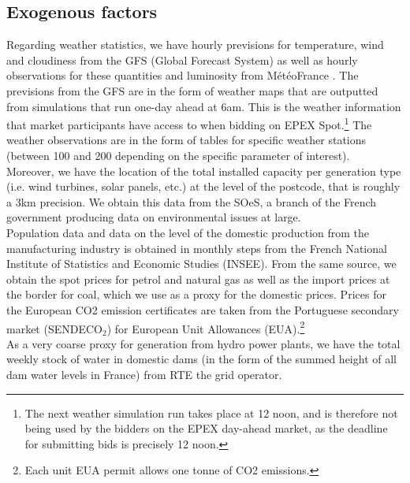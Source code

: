 \subsection*{Exogenous factors}

Regarding weather statistics, we have hourly previsions for temperature, wind and cloudiness from the GFS (Global Forecast System) as well as hourly observations for these quantities and luminosity from M\'{e}t\'{e}oFrance
. The previsions from the GFS are in the form of weather maps that are outputted from simulations that run one-day ahead at 6am. This is the weather information that market participants have access to when bidding on EPEX Spot.\footnote{The next weather simulation run takes place at 12 noon, and is therefore not being used by the bidders on the EPEX day-ahead market, as the deadline for submitting bids is precisely 12 noon.} The weather observations are in the form of tables for specific weather stations (between 100 and 200 depending on the specific parameter of interest).\\

Moreover, we have the location of the total installed capacity per generation type (i.e. wind turbines, solar panels, etc.) at the level of the postcode, that is roughly a 3km precision. We obtain this data from the SOeS, a branch of the French government producing data on environmental issues at large. \\

Population data and data on the level of the domestic production from the manufacturing industry is obtained in monthly steps from the French National Institute of Statistics and Economic Studies (INSEE). From the same source, we obtain the spot prices for petrol and natural gas as well as the import prices at the border for coal, which we use as a proxy for the domestic prices. 
Prices for the European CO2 emission certificates are taken from the Portuguese secondary market (SENDECO$_2$) for European Unit Allowances (EUA).\footnote{Each unit EUA permit allows one tonne of CO2 emissions.}\\

As a very coarse proxy for generation from hydro power plants, we have the total weekly stock of water in domestic dams (in the form of the summed height of all dam water levels in France) from RTE the grid operator.


